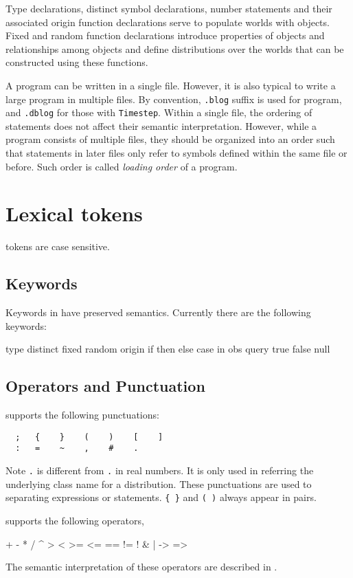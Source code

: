 \documentclass[12pt]{article}
\begin{document}
Type declarations, distinct symbol declarations, number statements and their associated origin function declarations serve to populate
worlds with objects. Fixed and random function declarations introduce properties of objects and relationships among objects
and define distributions over the worlds that can be constructed using these functions.

A \bl program can be written in a single file. However, it is also typical to write a large \bl program in multiple files. 
By convention, \texttt{.blog} suffix is used for \bl program, and \texttt{.dblog} for those with \verb|Timestep|. 
Within a single file, the ordering of statements does not affect their semantic interpretation. However, while a \bl program consists of multiple files, they should be organized into an order such that statements in later files only refer to symbols defined within the same file or before. Such order is called {\em loading order} of a \bl program. 

\section{Lexical tokens}
\bl tokens are case sensitive. 

\subsection{Keywords} \label{keyword-section}
Keywords in \bl have preserved semantics. Currently there are the following keywords:
\begin{blogcode}
  type    distinct    fixed    random    origin
  if      then        else     case      in
  obs     query       true     false     null
\end{blogcode}

\subsection{Operators and Punctuation}
\bl supports the following punctuations:
\begin{verbatim}
  ;   {    }    (    )    [    ]
  :   =    ~    ,    #    .
\end{verbatim}
Note \verb|.| is different from \verb|.| in real numbers. 
It is only used in referring the underlying class name for a distribution. 
These punctuations are used to separating expressions or statements. 
\verb|{ }| and \verb|( )| always appear in pairs. 

\bl supports the following operators,
\begin{blogcode}
  +    -    *    /    ^    %
  >    <    >=   <=   ==   !=
  !    &    |    ->   =>
\end{blogcode}
The semantic interpretation of these operators are described in .
\end{document}

